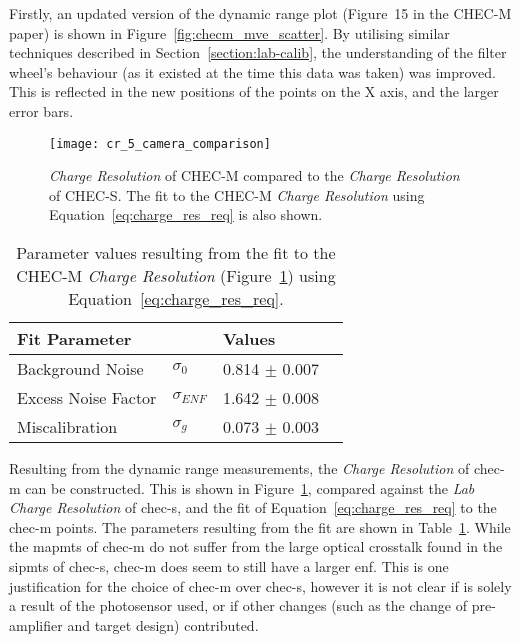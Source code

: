 Firstly, an updated version of the dynamic range plot (Figure~15 in the CHEC-M paper) is shown in Figure~\ref{fig:checm_mve_scatter}. By utilising similar techniques described in Section~\ref{section:lab-calib}, the understanding of the filter wheel's behaviour (as it existed at the time this data was taken) was improved. This is reflected in the new positions of the points on the X axis, and the larger error bars.

\begin{figure}
	\centering
    \texttt{[image: cr\_5\_camera\_comparison]} 
	\caption[\textit{Charge Resolution} of CHEC-M.]{\textit{Charge Resolution} of CHEC-M compared to the \textit{Charge Resolution} of CHEC-S. The fit to the CHEC-M \textit{Charge Resolution} using Equation~\ref{eq:charge_res_req} is also shown.}
	\label{fig:cr_5_camera_comparison}
\end{figure}

\begin{table}[h!]
\centering
\begin{tabular}{ll|ll} \toprule
    Fit Parameter        &                & Values             \\ \midrule
    Background Noise     & $\sigma_0$     & 0.814 $\pm$ 0.007  \\
    Excess Noise Factor  & $\sigma_{ENF}$ & 1.642 $\pm$ 0.008  \\
    Miscalibration       & $\sigma_g$     & 0.073 $\pm$ 0.003  \\ \bottomrule
\end{tabular}
\caption{Parameter values resulting from the fit to the CHEC-M \textit{Charge Resolution} (Figure~\ref{fig:cr_5_camera_comparison}) using Equation~\ref{eq:charge_res_req}.}
\label{table:cr_5_camera_comparison}
\end{table}

Resulting from the dynamic range measurements, the \textit{Charge Resolution} of \gls{chec-m} can be constructed. This is shown in Figure~\ref{fig:cr_5_camera_comparison}, compared against the \textit{Lab Charge Resolution} of \gls{chec-s}, and the fit of Equation~\ref{eq:charge_res_req} to the \gls{chec-m} points. The parameters resulting from the fit are shown in Table~\ref{table:cr_5_camera_comparison}. While the \glspl{mapmt} of \gls{chec-m} do not suffer from the large optical crosstalk found in the \glspl{sipmt} of \gls{chec-s}, \gls{chec-m} does seem to still have a larger \gls{enf}. This is one justification for the choice of \gls{chec-m} over \gls{chec-s}, however it is not clear if is solely a result of the photosensor used, or if other changes (such as the change of pre-amplifier and \gls{target} design) contributed.